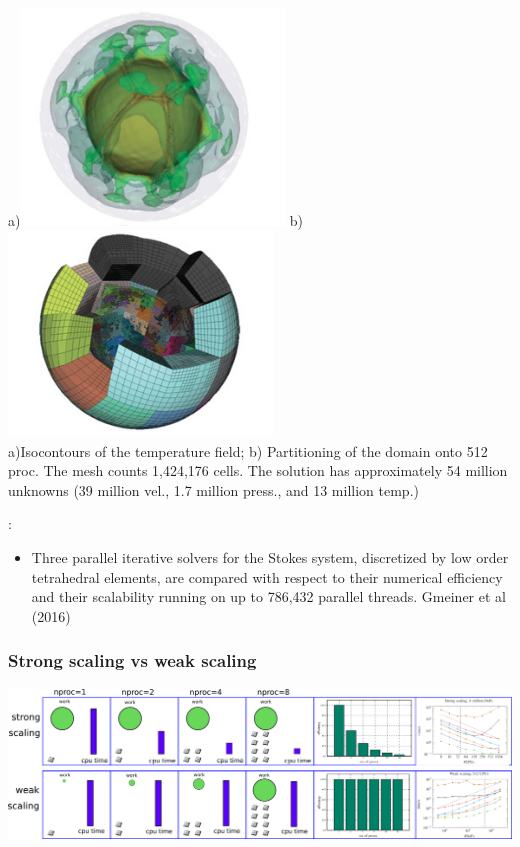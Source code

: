 \begin{center}
a)\includegraphics[width=7cm]{images/parallel/krhb2}
b)\includegraphics[width=7cm]{images/parallel/krhb1} \\
{\captionfont a)Isocontours of the temperature field; b) Partitioning of the domain onto 512 proc. 
The mesh counts 1,424,176 cells. The solution has approximately 54 million unknowns 
(39 million vel., 1.7 million press., and 13 million temp.)
}
\end{center}


\Literature:
\begin{itemize}
\item Three parallel iterative solvers for the Stokes system, discretized by low order 
tetrahedral elements, are compared with respect to their numerical efficiency and their 
scalability running on up to 786,432 parallel threads. Gmeiner et al (2016) \cite{gmhj16}
\end{itemize}


\subsubsection{Strong scaling vs weak scaling}

\begin{center}
\includegraphics[width=16cm]{images/parallel/fig}
\end{center}



